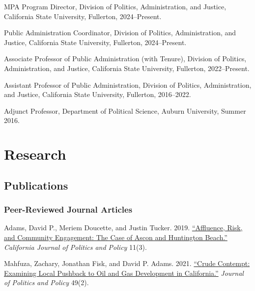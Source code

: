 \documentclass[12pt,letterpaper]{article}
\renewenvironment{itemize}{
  \begin{list}{}{
    \setlength{\leftmargin}{1.5em}
    \setlength{\itemsep}{0.25em}
    \setlength{\parskip}{0pt}
    \setlength{\parsep}{0.25em}
  }
}{
  \end{list}
}
\begin{document}
  \begin{itemize}\leftmargin=2pt\itemindent=-15pt\leftmargin=2pt\itemindent=-15pt
      \item MPA Program Director, Division of Politics, Administration, and Justice, California State University, Fullerton, 2024--Present. \vspace{0.2cm}
      \item Public Administration Coordinator, Division of Politics, Administration, and Justice, California State University, Fullerton, 2024--Present. \vspace{0.2cm}
      \item Associate Professor of Public Administration (with Tenure), Division of Politics, Administration, and Justice, California State University, Fullerton, 2022--Present. \vspace{0.2cm}
      \item Assistant Professor of Public Administration, Division of Politics, Administration, and Justice, California State University, Fullerton,  2016--2022.\vspace{0.2cm}
      \item Adjunct Professor, Department of Political Science, Auburn University, Summer 2016.
  \end{itemize}

\section*{Research}

\subsection*{Publications}

\subsubsection*{Peer-Reviewed Journal Articles}

\begin{itemize}\leftmargin=2pt\itemindent=-15pt\leftmargin=2pt\itemindent=-15pt

    \item Adams, David P., Meriem Doucette, and Justin Tucker. 2019. \href{https://escholarship.org/uc/item/2mz2n6qk}{``Affluence, Risk, and Community Engagement: The Case of Ascon and Huntington Beach.''} \emph{California Journal of Politics and Policy} 11(3).
    
    \item Mahfuza, Zachary, Jonathan Fisk, and David P. Adams. 2021. \href{https://doi.org/10.1111/polp.12401}{``Crude Contempt: Examining Local Pushback to Oil and Gas Development in California.''} \emph{Journal of Politics and Policy} 49(2).

  \end{itemize}
\end{document}
